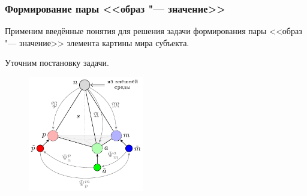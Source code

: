 \documentclass[default]{beamer}
\begin{document}
	\begin{frame}
		\frametitle{Формирование пары <<образ "--- значение>>}
		
		Применим введённые понятия для решения задачи формирования пары <<образ "--- значение>> элемента картины мира субъекта.
		\par\bigskip
		Уточним постановку задачи.
		
		\begin{figure}
			\includegraphics[width=0.45\textwidth]{signs/sign_naming_colored}
		\end{figure}
	\end{frame}
	
\end{document}
